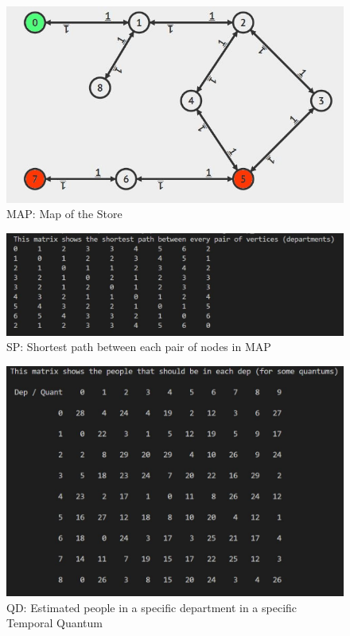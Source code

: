 \documentclass[a4paper, 12pt, oneside, table]{article}
\begin{document}
\begin{figure}[H]
\centering
    \centering
    \includegraphics[height=0.4\textheight, scale=0.2, keepaspectratio]{img/alg_map_man/store_graph.JPG}
    \caption{MAP: Map of the Store}
    \label{storeGraph}
\end{figure}
\begin{figure}[H]
\centering
    \centering
    \includegraphics[height=0.2\textheight, scale=0.1, keepaspectratio]{img/alg_map_man/warshall_matr.JPG}
    \caption{SP: Shortest path between each pair of nodes in MAP}
    \label{warshall}
\end{figure}
\begin{figure}[H]
\centering
    \centering
    \includegraphics[height=0.4\textheight, scale=0.2, keepaspectratio]{img/alg_map_man/dep_quant_mat.JPG}
    \caption{QD: Estimated people in a specific department in a specific Temporal Quantum}
    \label{qd}
\end{figure}
\end{document}
